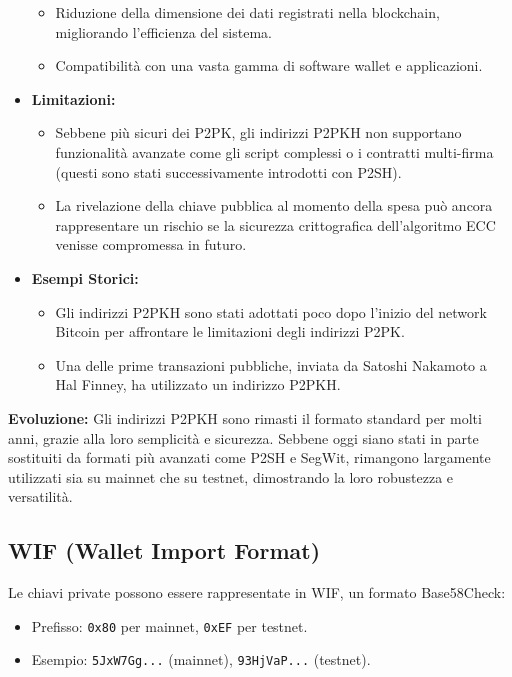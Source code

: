 \documentclass{article}
\begin{document}
\begin{itemize}
\begin{itemize}
        \item Riduzione della dimensione dei dati registrati nella blockchain, migliorando l'efficienza del sistema.
        \item Compatibilità con una vasta gamma di software wallet e applicazioni.
    \end{itemize}
    \item \textbf{Limitazioni:}
    \begin{itemize}
        \item Sebbene più sicuri dei P2PK, gli indirizzi P2PKH non supportano funzionalità avanzate come gli script complessi o i contratti multi-firma (questi sono stati successivamente introdotti con P2SH).
        \item La rivelazione della chiave pubblica al momento della spesa può ancora rappresentare un rischio se la sicurezza crittografica dell'algoritmo ECC venisse compromessa in futuro.
    \end{itemize}
    \item \textbf{Esempi Storici:}
    \begin{itemize}
        \item Gli indirizzi P2PKH sono stati adottati poco dopo l'inizio del network Bitcoin per affrontare le limitazioni degli indirizzi P2PK.
        \item Una delle prime transazioni pubbliche, inviata da Satoshi Nakamoto a Hal Finney, ha utilizzato un indirizzo P2PKH.
    \end{itemize}
\end{itemize}

\textbf{Evoluzione:} Gli indirizzi P2PKH sono rimasti il formato standard per molti anni, grazie alla loro semplicità e sicurezza. Sebbene oggi siano stati in parte sostituiti da formati più avanzati come P2SH e SegWit, rimangono largamente utilizzati sia su mainnet che su testnet, dimostrando la loro robustezza e versatilità.


\subsection{WIF (Wallet Import Format)}
Le chiavi private possono essere rappresentate in WIF, un formato Base58Check:
\begin{itemize}
    \item Prefisso: \texttt{0x80} per mainnet, \texttt{0xEF} per testnet.
    \item Esempio: \texttt{5JxW7Gg...} (mainnet), \texttt{93HjVaP...} (testnet).
\end{itemize}
\end{document}
